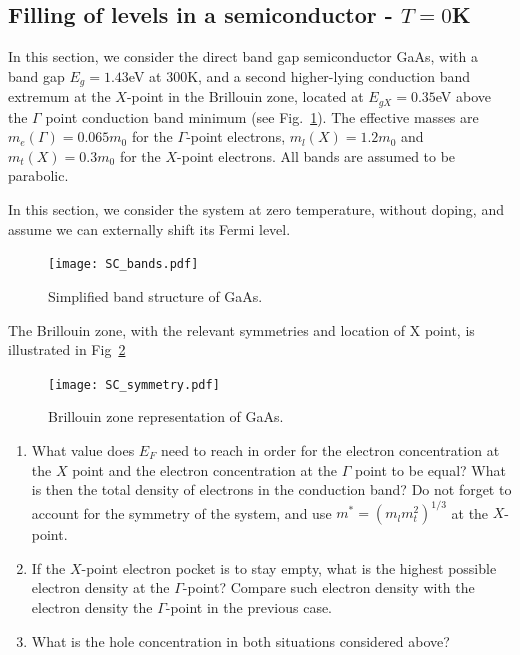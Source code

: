 \subsection{Filling of levels in a semiconductor - $T=0$K}

In this section, we consider the direct band gap semiconductor GaAs,
with a band gap $E_g = 1.43$eV at 300K, and a second higher-lying
conduction band extremum at the $X$-point in the Brillouin zone,
located at $E_{gX} = 0.35$eV above the $\Gamma$ point conduction band
minimum (see Fig.~\ref{fig:SC_bands}). The effective masses are $m_e(\Gamma) =
0.065 m_0$ for the $\Gamma$-point electrons, $m_l(X) =
1.2 m_0$ and $m_t(X) = 0.3 m_0$ for the $X$-point electrons. All bands
are assumed to be parabolic.

In this section, we consider the system at
zero temperature, without doping, and assume we can externally shift
its Fermi level.

\begin{figure}[h]
  \centering
  \texttt{[image: SC\_bands.pdf]}
  \caption{Simplified band structure of GaAs.\label{fig:SC_bands}}
\end{figure}

The Brillouin zone, with the relevant symmetries and location of X
point, is illustrated in Fig~\ref{fig:SC_symmetry}

\begin{figure}[h]
  \centering
  \texttt{[image: SC\_symmetry.pdf]}
  \caption{Brillouin zone representation of GaAs.\label{fig:SC_symmetry}}
\end{figure}

\begin{enumerate}[label=(\roman*)]
\item What value does $E_F$ need to reach in order for the electron
  concentration at the $X$ point and the electron concentration at the
  $\Gamma$ point to be equal? What is then the total density of
  electrons in the conduction band? Do not forget to account for the
  symmetry of the system, and use $m^{*} = (m_l m_t^2)^{1/3}$ at the
  $X$-point.
\item If the $X$-point electron pocket is to stay empty, what is the
  highest possible electron density at the $\Gamma$-point?
  Compare such electron density with the electron density the
  $\Gamma$-point in the previous case.
\item What is the hole concentration in both situations considered above?
\end{enumerate}

